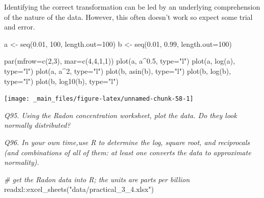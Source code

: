 \documentclass[
  11pt,
  a4paper,
]{book}
\newenvironment{Shaded}{\begin{snugshade}}{\end{snugshade}}
\newcommand{\AttributeTok}[1]{\textcolor[rgb]{0.77,0.63,0.00}{#1}}
\newcommand{\CommentTok}[1]{\textcolor[rgb]{0.56,0.35,0.01}{\textit{#1}}}
\newcommand{\DecValTok}[1]{\textcolor[rgb]{0.00,0.00,0.81}{#1}}
\newcommand{\FloatTok}[1]{\textcolor[rgb]{0.00,0.00,0.81}{#1}}
\newcommand{\FunctionTok}[1]{\textcolor[rgb]{0.00,0.00,0.00}{#1}}
\newcommand{\NormalTok}[1]{#1}
\newcommand{\OtherTok}[1]{\textcolor[rgb]{0.56,0.35,0.01}{#1}}
\newcommand{\SpecialCharTok}[1]{\textcolor[rgb]{0.00,0.00,0.00}{#1}}
\newcommand{\StringTok}[1]{\textcolor[rgb]{0.31,0.60,0.02}{#1}}
\begin{document}
Identifying the correct transformation can be led by an underlying comprehension of the nature of the data. However, this often doesn't work so expect some trial and error.

\begin{Shaded}
\begin{Highlighting}[]
\NormalTok{a }\OtherTok{\textless{}{-}} \FunctionTok{seq}\NormalTok{(}\FloatTok{0.01}\NormalTok{, }\DecValTok{100}\NormalTok{, }\AttributeTok{length.out=}\DecValTok{100}\NormalTok{)}
\NormalTok{b }\OtherTok{\textless{}{-}} \FunctionTok{seq}\NormalTok{(}\FloatTok{0.01}\NormalTok{, }\FloatTok{0.99}\NormalTok{, }\AttributeTok{length.out=}\DecValTok{100}\NormalTok{)}

\FunctionTok{par}\NormalTok{(}\AttributeTok{mfrow=}\FunctionTok{c}\NormalTok{(}\DecValTok{2}\NormalTok{,}\DecValTok{3}\NormalTok{), }\AttributeTok{mar=}\FunctionTok{c}\NormalTok{(}\DecValTok{4}\NormalTok{,}\DecValTok{4}\NormalTok{,}\DecValTok{1}\NormalTok{,}\DecValTok{1}\NormalTok{))}
\FunctionTok{plot}\NormalTok{(a, a}\SpecialCharTok{\^{}}\FloatTok{0.5}\NormalTok{, }\AttributeTok{type=}\StringTok{"l"}\NormalTok{)}
\FunctionTok{plot}\NormalTok{(a, }\FunctionTok{log}\NormalTok{(a), }\AttributeTok{type=}\StringTok{"l"}\NormalTok{)}
\FunctionTok{plot}\NormalTok{(a, a}\SpecialCharTok{\^{}}\DecValTok{2}\NormalTok{, }\AttributeTok{type=}\StringTok{"l"}\NormalTok{)}
\FunctionTok{plot}\NormalTok{(b, }\FunctionTok{asin}\NormalTok{(b), }\AttributeTok{type=}\StringTok{"l"}\NormalTok{)}
\FunctionTok{plot}\NormalTok{(b, }\FunctionTok{log}\NormalTok{(b), }\AttributeTok{type=}\StringTok{"l"}\NormalTok{)}
\FunctionTok{plot}\NormalTok{(b, }\FunctionTok{log10}\NormalTok{(b), }\AttributeTok{type=}\StringTok{"l"}\NormalTok{)}
\end{Highlighting}
\end{Shaded}

\begin{center}\texttt{[image: \_main\_files/figure-latex/unnamed-chunk-58-1]} \end{center}

\emph{Q95. Using the Radon concentration worksheet, plot the data. Do they look normally distributed?}

\emph{Q96. In your own time,use R to determine the log, square root, and reciprocals (and combinations of all of them: at least one converts the data to approximate normality).}

\begin{Shaded}
\begin{Highlighting}[]
\CommentTok{\# get the Radon data into R; the units are parts per billion}
\NormalTok{readxl}\SpecialCharTok{::}\FunctionTok{excel\_sheets}\NormalTok{(}\StringTok{"data/practical\_3\_4.xlsx"}\NormalTok{) }
\end{Highlighting}
\end{Shaded}
\end{document}
